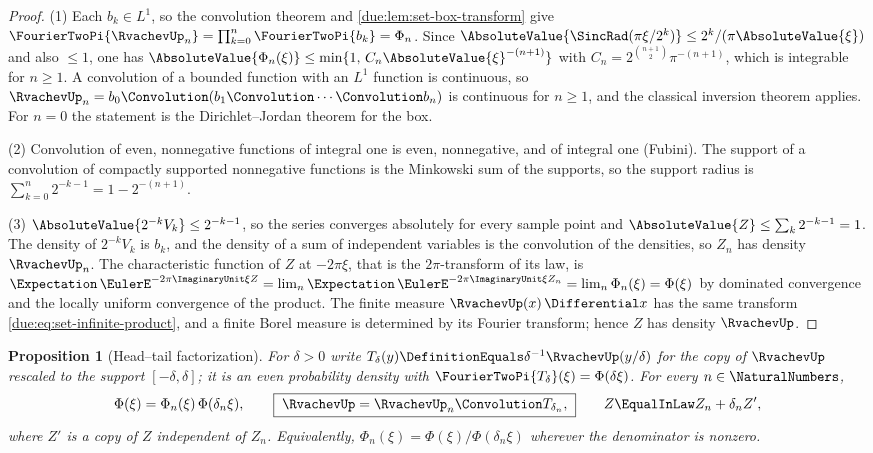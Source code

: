 \documentclass[11pt,oneside]{article}
\theoremstyle{plain}
\newtheorem{proposition}[theorem]{Proposition}
\theoremstyle{definition}
\theoremstyle{remark}
\newcommand{\upn}[1]{\RvachevUp_{#1}}
\newcommand{\Phin}[1]{\Phi_{#1}}                            %
\newcommand{\PhiUp}{\Phi}                                   %
\begin{document}
\begin{proof}
(1) Each $b_k\in L^{1}$, so the convolution theorem and
\cref{due:lem:set-box-transform} give
$\FourierTwoPi{\upn{n}}=\prod_{k=0}^{n}\FourierTwoPi{b_k}=\Phin{n}$.  Since
$\AbsoluteValue{\SincRad(\pi\xi/2^{k})}\le 2^{k}/(\pi\AbsoluteValue{\xi})$
and also $\le1$, one has
$\AbsoluteValue{\Phin{n}(\xi)}\le\min\{1,\,C_n\AbsoluteValue{\xi}^{-(n+1)}\}$
with $C_n=2^{\binom{n+1}{2}}\pi^{-(n+1)}$, which is integrable for
$n\ge1$.  A convolution of a bounded function with an $L^{1}$ function is
continuous, so $\upn{n}=b_0\Convolution(b_1\Convolution\cdots\Convolution b_n)$
is continuous for $n\ge1$, and the classical inversion theorem applies.
For $n=0$ the statement is the Dirichlet--Jordan theorem for the box.

(2) Convolution of even, nonnegative functions of integral one is even,
nonnegative, and of integral one (Fubini).  The support of a convolution of
compactly supported nonnegative functions is the Minkowski sum of the
supports, so the support radius is $\sum_{k=0}^{n}2^{-k-1}=1-2^{-(n+1)}$.

(3) $\AbsoluteValue{2^{-k}V_k}\le2^{-k-1}$, so the series converges
absolutely for every sample point and $\AbsoluteValue{Z}\le\sum_k2^{-k-1}=1$.
The density of $2^{-k}V_k$ is $b_k$, and the density of a sum of independent
variables is the convolution of the densities, so $Z_n$ has density
$\upn{n}$.  The characteristic function of $Z$ at $-2\pi\xi$, that is the
$2\pi$-transform of its law, is
$\Expectation\,\EulerE^{-2\pi\ImaginaryUnit\xi Z}
=\lim_{n}\Expectation\,\EulerE^{-2\pi\ImaginaryUnit\xi Z_n}
=\lim_{n}\Phin{n}(\xi)=\PhiUp(\xi)$ by dominated convergence and the
locally uniform convergence of the product.  The finite measure
$\RvachevUp(x)\,\Differential x$ has the same transform
\cref{due:eq:set-infinite-product}, and a finite Borel measure is determined
by its Fourier transform; hence $Z$ has density $\RvachevUp$.
\end{proof}

\begin{proposition}[Head--tail factorization]
\label{due:prop:set-head-tail}
For $\delta>0$ write $T_\delta(y)\DefinitionEquals\delta^{-1}\RvachevUp(y/\delta)$
for the copy of $\RvachevUp$ rescaled to the support $[-\delta,\delta]$; it
is an even probability density with $\FourierTwoPi{T_\delta}(\xi)=\PhiUp(\delta\xi)$.
For every $n\in\NaturalNumbers$,
\begin{equation}
 \PhiUp(\xi)=\Phin{n}(\xi)\,\PhiUp(\delta_n\xi),
 \qquad
 \boxed{\;\RvachevUp=\upn{n}\Convolution T_{\delta_n},\;}
 \qquad
 Z\EqualInLaw Z_n+\delta_n Z',
 \label{due:eq:set-head-tail}
\end{equation}
where $Z'$ is a copy of $Z$ independent of $Z_n$.  Equivalently,
$\Phin{n}(\xi)=\PhiUp(\xi)/\PhiUp(\delta_n\xi)$ wherever the denominator is
nonzero.
\end{proposition}
\end{document}
